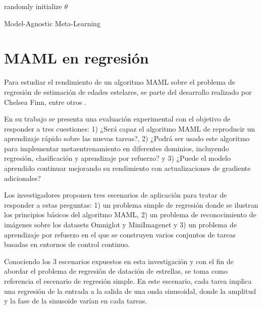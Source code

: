 \vspace{1cm}

\begin{algorithm}[H]
 randomly initialize $\theta$ \;
 \caption{Model-Agnostic Meta-Learning}
\end{algorithm}


\section{MAML en regresión}

Para estudiar el rendimiento de un algoritmo MAML sobre el problema de regresión de estimación de edades estelares, se parte del desarrollo realizado por Chelsea Finn, entre otros \cite{finn2017modelagnostic}. 

En su trabajo se presenta una evaluación experimental con el objetivo de responder a tres cuestiones: 1) ¿Será capaz el algoritmo MAML de reproducir un aprendizaje rápido sobre las nuevas tareas?, 2) ¿Podrá ser usado este algoritmo para implementar metaentrenamiento en diferentes dominios, incluyendo regresión, clasificación y aprendizaje por refuerzo? y 3) ¿Puede el modelo aprendido continuar mejorando su rendimiento con actualizaciones de gradiente adicionales?

Los investigadores proponen tres escenarios de aplicación para tratar de responder a estas preguntas: 1) un problema simple de regresión donde se ilustran los principios básicos del algoritmo MAML, 2) un problema de reconocimiento de imágenes sobre los datasets Omniglot y MiniImagenet y 3) un problema de aprendizaje por refuerzo en el que se construyen varios conjuntos de tareas basadas en entornos de control continuo.

Conociendo los 3 escenarios expuestos en esta investigación y con el fin de abordar el problema de regresión de datación de estrellas, se toma como referencia el escenario de regresión simple. En este escenario, cada tarea implica una regresión de la entrada a la salida de una onda sinusoidal, donde la amplitud y la fase de la sinusoide varían en cada tareas.

